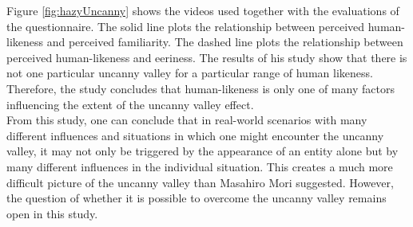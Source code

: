 Figure \ref{fig:hazyUncanny} shows the videos used together with the evaluations of the questionnaire. The solid line plots the relationship between perceived human-likeness and perceived familiarity. The dashed line plots the relationship between perceived human-likeness and eeriness. The results of his study show that there is not one particular uncanny valley for a particular range of human likeness. Therefore, the study concludes that human-likeness is only one of many factors influencing the extent of the uncanny valley effect.\\
From this study, one can conclude that in  real-world scenarios with many different influences and situations in which one might encounter the uncanny valley, it may not only be triggered by the appearance of an entity alone but by many different influences in the individual situation. This creates a much more difficult picture of the uncanny valley than Masahiro Mori suggested. However, the question of whether it is possible to overcome the uncanny valley remains open in this study.

